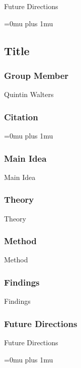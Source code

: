 \noindent
Future Directions 

\Urlmuskip=0mu plus 1mu\relax

\noindent
\subsection{Title}

\subsubsection{Group Member}

\noindent
Quintin Walters

\noindent
\subsubsection{Citation}

\Urlmuskip=0mu plus 1mu\relax

\subsubsection{Main Idea}

\noindent
Main Idea

\subsubsection{Theory}

\noindent
Theory

\subsubsection{Method}

\noindent
Method

\subsubsection{Findings}

\noindent
Findings

\subsubsection{Future Directions}

\noindent
Future Directions 

\Urlmuskip=0mu plus 1mu\relax
\pagebreak